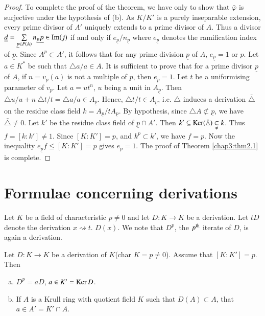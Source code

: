 \begin{proof}
To complete the proof of the theorem, we have only to show that
$\bar{\varphi}$ is surjective under the hypothesis of (b). As $K /
K'$ is a purely inseparable extension, every prime divisor of $A'$
uniquely extends to a prime divisor of $A$. Thus a divisor
$\underline{d} = \sum\limits_{\underline{p} \in P(A)}
n_{\underline{p}} \underline{p} \in \operatorname{Im} (j)$ if and only if
$e_{\underline{p}} \big / n_{\underline{p}}$ where $e_{\underline{p}}$
denotes the ramification index of $\underline{p}$. Since $
A^p \subset A'$, it follows that for any prime division $\underline{p}$ of $A$,
$e_{\underline{p}} = 1$ or $p$. Let $a \in K^*$ be such that $\triangle
a / a \in A$. It is sufficient to prove that for a prime divisor
$\underline{p}$ of $A$, if $n = v_p (a)$ is not a multiple of $p$,
then $e_p = 1$. Let $t$ be a uniformising parameter of $v_p$. Let $a =
ut^n$, $u$ being a unit in $A_{\underline{p}}$. Then $\triangle u/u + n
~ \triangle t/t = \triangle a/a \in A_{\underline{p}}$. Hence,
$\triangle t/t \in A_{\underline{p}}$, i.e. $\triangle$\pageoriginale
induces a 
derivation $\bar{\triangle}$ on the residue class field $k =
A_{\underline{p}} \big/ t A_{\underline{p}}$. By hypothesis, since
$\triangle A \nsubset \underline{p}$, we have $\bar{\triangle} \neq
0$. Let $k'$ be the residue class field of $\underline{p} \cap
A'$. Then $k ' \subseteq \operatorname{Ker} (\bar{\triangle})
\underset{\neq}{\subset} k$. Thus $f 
= [k : k' ] \neq 1$. Since $[K : K'] = p$, and $k^p \subset k'$, we
have $f = p$. Now the inequality $e_{\underline{p}} f \le [K : K '] =
p$ gives $e_p = 1$. The proof of Theorem \ref{chap3:thm2.1} is complete.  
\end{proof}   
     

\section{Formulae concerning derivations}\label{chap3:sec3}%
    
    Let $K$ be a field of characteristic $p \neq 0$ and let $D : K \to
    K$ be a derivation. Let $tD$ denote the derivation $x
    \rightsquigarrow t$. $D(x)$. We note that $D^p$, the $p^{\rm th}$
    iterate of $D$, is again a derivation. 
    
    \begin{prop}\label{chap3:prop3.1} %
Let  $D : K \to K$ be a derivation of $K$(char $K = p \neq
  0$). Assume that $[K : K'] = p$. Then 
\begin{enumerate}[(a)]
\item $ D^p = a D$, $a \in K' = \operatorname{Ker} D$.

\item If $A$ is a Krull ring with quotient field $K$ such that
  $D(A) \subset A$, that $a \in A' = K' \cap A$. 
\end{enumerate}
    \end{prop} 
      
